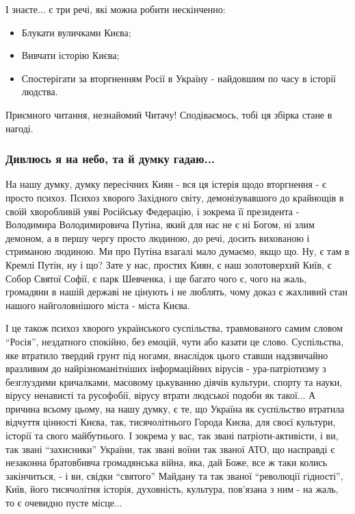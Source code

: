 І знаєте... є три речі, які можна робити нескінченно:

\begin{itemize} %
\item Блукати вуличками Києва;
\item Вивчати історію Києва;
\item Спостерігати за вторгненням Росії в Україну - найдовшим по часу в історії людства.
\end{itemize} %

Приємного читання, незнайомий Читачу! Сподіваємось, тобі ця збірка стане в нагоді.

\clearpage
\subsubsection{Дивлюсь я на небо, та й думку гадаю...}

На нашу думку, думку пересічних Киян - вся ця істерія щодо вторгнення - є
просто психоз. Психоз хворого Західного світу, демонізувавшого до крайнощів в
своїй хворобливій уяві Російську Федерацію, і зокрема її президента -
Володимира Володимировича Путіна, який для нас не є ні Богом, ні злим демоном,
а в першу чергу просто людиною, до речі, досить вихованою і стриманою людиною.
Ми про Путіна взагалі мало думаємо, якщо що. Ну, є там в Кремлі Путін, ну і що?
Зате у нас, простих Киян, є наш золотоверхий Київ, є Собор Святої Софії, є парк
Шевченка, і ще багато чого є, чого на жаль, громадяни в нашій державі не
цінують і не люблять, чому доказ є жахливий стан нашого найголовнішого міста -
міста Києва.

І це також психоз хворого українського суспільства, травмованого самим словом
\enquote{Росія}, нездатного спокійно, без емоцій, чути або казати це слово.
Суспільства, яке втратило твердий грунт під ногами, внаслідок цього ставши
надзвичайно вразливим до найрізноманітніших інформаційних вірусів -
ура-патріотизму з безглуздими кричалками, масовому цькуванню діячів культури,
спорту та науки, вірусу ненависті та русофобії, вірусу втрати людської подоби
як такої... А причина всьому цьому, на нашу думку, є те, що Україна як
суспільство втратила відчуття цінності Києва, так, тисячолітнього Города Києва,
для своєї культури, історії та свого майбутнього. І зокрема у вас, так звані
патріоти-активісти, і ви, так звані \enquote{захисники} України, так звані
воїни так званої АТО, що насправді є незаконна братовбивча громадянська війна,
яка, дай Боже, все ж таки колись закінчиться, - і ви, свідки \enquote{святого}
Майдану та так званої \enquote{революції гідності}, Київ, його тисячолітня
історія, духовність, культура, пов'язана з ним - на жаль, то є очевидно пусте
місце...

